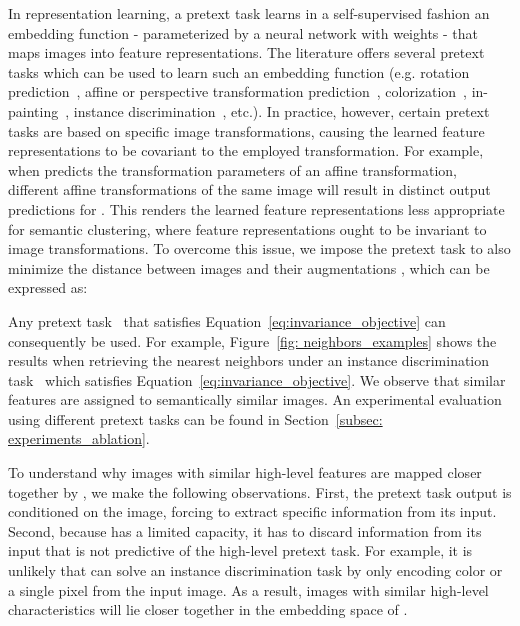 \documentclass[runningheads]{llncs}
\begin{document}
In representation learning, a pretext task  learns in a self-supervised fashion an embedding function  - parameterized by a neural network with weights  - that maps images into feature representations. The literature offers several pretext tasks which can be used to learn such an embedding function  (e.g. rotation prediction~\cite{RotNet}, affine or perspective transformation prediction~\cite{zhang2019aet}, colorization~\cite{larsson2017colorization}, in-painting~\cite{ContextEncoders}, instance discrimination~\cite{wu2018unsupervised,he2019momentum,chen2020simple,PIRL}, etc.). In practice, however, certain pretext tasks are based on specific image transformations, causing the learned feature representations to be covariant to the employed transformation. 
For example, when  predicts the transformation parameters of an affine transformation, different affine transformations of the same image will result in distinct output predictions for . 
This renders the learned feature representations less appropriate for semantic clustering, where feature representations ought to be invariant to image transformations. To overcome this issue, we impose the pretext task  to also minimize the distance between images  and their augmentations , which can be expressed as:

Any pretext task~\cite{wu2018unsupervised,he2019momentum,chen2020simple,PIRL} that satisfies Equation~\ref{eq:invariance_objective} can consequently be used.
For example, Figure~\ref{fig: neighbors_examples} shows the results when retrieving the nearest neighbors under an instance discrimination task~\cite{wu2018unsupervised} which satisfies Equation~\ref{eq:invariance_objective}. We observe that similar features are assigned to semantically similar images. An experimental evaluation using different pretext tasks can be found in Section~\ref{subsec: experiments_ablation}. 

To understand why images with similar high-level features are mapped closer together by , we make the following observations. First, the pretext task output is conditioned on the image, forcing  to extract specific information from its input. Second, because  has a limited capacity, it has to discard information from its input that is not predictive of the high-level pretext task. For example, it is unlikely that  can solve an instance discrimination task by only encoding color or a single pixel from the input image. As a result, images with similar high-level characteristics will lie closer together in the embedding space of . 
\end{document}
